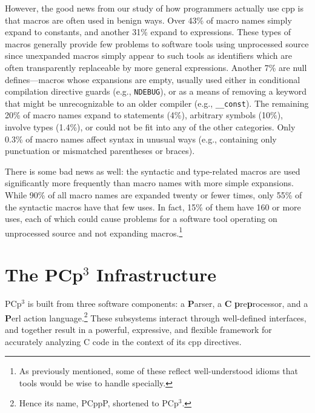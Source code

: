\documentclass{article}
\newcommand{\pcp}{\mbox{\textsf{PCp}$^3$}}
\newcommand{\pcppp}{\mbox{\textsf{PCppP}}}
\newcommand{\Cpp}{\mbox{\textsf{cpp}}}
\newcommand{\C}{\mbox{\textsf{C}}}
\newcommand{\ppd}[1]{\texttt{\##1}}
\newcommand{\eg}{e.g.,}
\begin{document}
However, the good news from our study of how programmers actually use
\Cpp{} is that macros are often used in benign ways.  Over 43\% of macro
names simply expand to constants, and another 31\% expand to
expressions.  These types of macros generally provide few problems to
software tools using unprocessed source since unexpanded macros simply
appear to such tools as identifiers which are often transparently
replaceable by more general expressions.  Another 7\% are null
defines---macros whose expansions are empty, usually used either in
conditional compilation directive guards (\eg{} \texttt{NDEBUG}), or as a means
of removing a keyword that might be unrecognizable to an older compiler
(\eg{} \texttt{\_\_const}).  The remaining 20\% of macro names expand to statements
(4\%), arbitrary symbols (10\%), involve types (1.4\%), or could not be
fit into any of the other categories.  Only 0.3\% of macro names affect syntax in
unusual ways (\eg{} containing only punctuation or mismatched
parentheses or braces).

There is some bad news as well: the syntactic and type-related
macros are used significantly more frequently than macro names with more
simple expansions.  While 90\% of all macro names are expanded twenty or
fewer times, only 55\% of the syntactic macros have that few uses.  In
fact, 15\% of them have 160 or more uses, each of which could cause
problems for a software tool operating on unprocessed source and not
expanding macros.\footnote{As previously mentioned, some of these reflect
  well-understood idioms that tools would be wise to handle specially.}



\section{The \pcp{} Infrastructure}
\label{sec:pcp3}
\pcp{} is built from three software components: a \textbf{\textsf{P}}arser, a \textbf{\textsf{C}}
\textbf{\textsf{p}}re\textbf{\textsf{p}}rocessor, and a \textbf{\textsf{P}}erl action
language.\footnote{Hence its name, \pcppp{}, shortened to \pcp{}.}
These subsystems interact through well-defined interfaces, and together
result in a powerful, expressive, and flexible framework for accurately
analyzing \C{} code in the context of its \Cpp{} directives.
\end{document}
